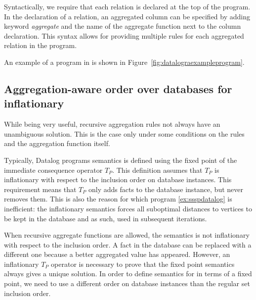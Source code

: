 Syntactically, we require that each \idb relation is declared at the top of the program.
In the declaration of a relation, an aggregated column can be specified by adding keyword \textit{aggregate} and the name of the aggregate function next to the column declaration. This syntax allows for providing multiple rules for each aggregated relation in the program.

An example of a program in \datalogra is shown in Figure~\ref{fig:datalograexampleprogram}.

\begin{figure}[!htbp]
\end{figure}


\subsection{Aggregation-aware order over databases for inflationary \datalogra}
While being very useful, recursive aggregation rules not always have an unambiguous solution. This is the case only under some conditions on the rules and the aggregation function itself.

Typically, Datalog programs semantics is defined using the fixed point of the immediate consequence operator $T_P$. This definition assumes that $T_P$ is inflationary with respect to the inclusion order on database instances. This requirement means that $T_P$ only adds facts to the database instance, but never removes them. This is also the reason for which program \ref{ex:ssspdatalog} is inefficient: the inflationary semantics forces all suboptimal distances to vertices to be kept in the database and as such, used in subsequent iterations.

When recursive aggregate functions are allowed, the semantics is not inflationary with respect to the inclusion order. A fact in the database can be replaced with a different one because a better aggregated value has appeared. However, an inflationary $T_P$ operator is necessary to prove that the fixed point semantics always gives a unique solution. In order to define semantics for \datalogra in terms of a fixed point, we need to use a different order on database instances than the regular set inclusion order.

